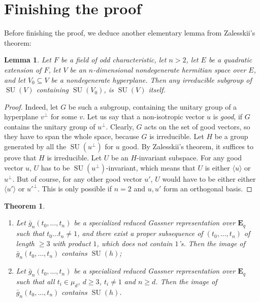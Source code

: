 \documentclass{article}
\newtheorem{theorem}{Theorem}
\newtheorem{lemma}{Lemma}
\theoremstyle{definition}
\DeclareMathOperator{\SU}{\mathrm{SU}}
\begin{document}
	\section{Finishing the proof}
	Before finishing the proof, we deduce another elementary lemma from Zalesskii's theorem:
	\begin{lemma} \label{hyperplane}
		Let $F$ be a field of odd characteristic, let $n > 2$, let $E$ be a quadratic extension of $F$, let $V$ be an $n$-dimensional nondegenerate hermitian space over $E$, and let $V_0 \subseteq V$ be a nondegenerate hyperplane. Then any irreducible subgroup of $\SU(V)$ containing $\SU(V_0)$, is $\SU(V)$ itself.
	\end{lemma}
	\begin{proof}
		Indeed, let $G$ be such a subgroup, containing the unitary group of a hyperplane $v^{\perp}$ for some $v$. Let us say that a non-isotropic vector $u$ is \emph{good}, if $G$ contains the unitary group of $u^{\perp}$. Clearly, $G$ acts on the set of good vectors, so they have to span the whole space, because $G$ is irreducible. Let $H$ be a group generated by all the $\SU(u^{\perp})$ for $u$ good. By Zalesskii's theorem, it suffices to prove that $H$ is irreducible. Let $U$ be an $H$-invariant subspace. For any good vector $u$, $U$ has to be $\SU(u^{\perp})$-invariant, which means that $U$ is either $\langle u \rangle $ or $u^{\perp}$. But of course, for any other good vector $u'$, $U$ would have to be either either $\langle u' \rangle $ or $u'^{\perp}$. This is only possible if $n=2$ and $u,u'$ form an orthogonal basis.
	\end{proof} 
	\begin{theorem} 
		\begin{enumerate}
			\item Let $\bar{g}_n(t_0, \ldots, t_n)$ be a specialized reduced Gassner representation over $\mathbf{E}_q$ such that $t_0 \ldots t_n \neq 1$, and there exist a proper subsequence of $(t_0, \ldots, t_n)$ of length $\geqslant 3$ with product $1$, which does not contain $1$'s. Then the image of $\bar{g}_n(t_0, \ldots, t_n)$ contains $\SU(h)$;
			\item Let $\bar{g}_n(t_0, \ldots, t_n)$ be a specialized reduced Gassner representation over $\mathbf{E}_q$ such that all $t_i \in \mu_d$, $d \geq 3$, $t_i \neq 1$ and $n \geqslant d$. Then the image of $\bar{g}_n(t_0, \ldots, t_n)$ contains $\SU(h)$.
		\end{enumerate}
	\end{theorem}
\end{document}
